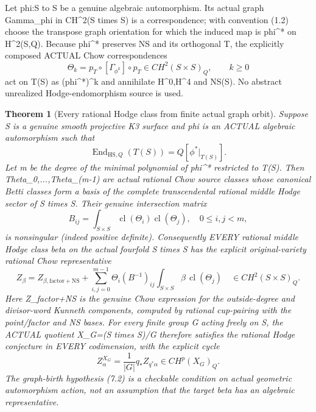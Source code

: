 \documentclass[11pt]{article}
\newcommand{\cl}{\operatorname{cl}}
\newtheorem{theorem}{Theorem}[section]
\begin{document}
Let phi:S to S be a genuine algebraic automorphism.
Its actual graph Gamma_phi in CH^2(S times S)
is a correspondence; with convention (1.2)
choose the transpose graph orientation for which
the induced map is phi^* on H^2(S,Q).
Because phi^* preserves NS and its orthogonal T,
the explicitly composed ACTUAL Chow correspondences
\[
 \boxed{
 \Theta_k=p_T\circ[\Gamma_{\phi^k}]\circ p_T
       \in CH^2(S\times S)_Q,\qquad k\ge0
 }                                                       \tag{7.1}
\]
act on T(S) as (phi^*)^k and annihilate
H^0,H^4 and NS(S). No abstract
unrealized Hodge-endomorphism source is used.

\begin{theorem}[Every rational Hodge class from finite actual graph orbit]
Suppose S is a genuine smooth projective K3 surface
and phi is an ACTUAL algebraic automorphism such that
\[
 \boxed{
 \operatorname{End}_{\mathrm{HS},Q}(T(S))
      =Q[\phi^*|_{T(S)}].}                           \tag{7.2}
\]
Let m be the degree of the minimal polynomial
of phi^* restricted to T(S). Then
Theta_0,...,Theta_(m-1) are actual
rational Chow source classes whose
canonical Betti classes form a basis
of the complete transcendental rational
middle Hodge sector of S times S.
Their genuine intersection matrix
\[
 B_{ij}=\int_{S\times S}
           \cl(\Theta_i)\cl(\Theta_j),
             \quad0\le i,j<m,                     \tag{7.3}
\]
is nonsingular (indeed positive definite).
Consequently EVERY rational middle Hodge class
beta on the actual fourfold S times S
has the explicit original-variety rational
Chow representative
\[
 \boxed{
 Z_\beta=Z_{\beta,\mathrm{factor+NS}}
   +\sum_{i,j=0}^{m-1}
      \Theta_i(B^{-1})_{ij}
       \int_{S\times S}\beta\,\cl(\Theta_j)
       \quad\in CH^2(S\times S)_Q.}                \tag{7.4}
\]
Here Z_factor+NS is the genuine Chow expression
for the outside-degree and divisor-word Kunneth
components, computed by rational cup-pairing
with the point/factor and NS bases.
For every finite group G acting freely on S,
the ACTUAL quotient X_G=(S times S)/G
therefore satisfies the rational Hodge conjecture
in EVERY codimension, with the explicit cycle
\[
 \boxed{
 Z_\alpha^{X_G}=
   \frac1{|G|}q_*Z_{q^*\alpha}
                       \in CH^p(X_G)_Q.}          \tag{7.5}
\]
The graph-birth hypothesis (7.2) is a
checkable condition on actual geometric
automorphism action, not an assumption
that the target beta has an algebraic
representative.
\end{theorem}
\end{document}
